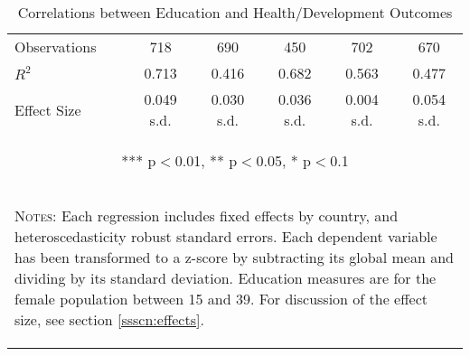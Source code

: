 \begin{landscape}
\begin{table}[htpb!]
\begin{center}
\begin{tabular}{lccccc}
Observations	&	718	&	690	&	450	&	702	&	670	\\
$R^2$	&	0.713	&	0.416	&	0.682	&	0.563	&	0.477	\\ 
Effect Size & 0.049 s.d. & 0.030 s.d. & 0.036 s.d. & 0.004 s.d. & 0.054 s.d. \\
\midrule
\multicolumn{6}{c}{\begin{footnotesize} *** p$<$0.01, ** p$<$0.05, * p$<$0.1\end{footnotesize}} \\											
\multicolumn{6}{p{17.7cm}}{\begin{footnotesize}\textsc{Notes:} Each regression includes fixed effects by country, and heteroscedasticity robust standard errors.  Each dependent variable has been transformed to a z-score by subtracting its global mean and dividing by its standard deviation.  Education measures are for the female population between 15 and 39. For discussion of the effect size, see section \ref{ssscn:effects}. \end{footnotesize}} \\											
\bottomrule											
\end{tabular}											
\caption{Correlations between Education and Health/Development Outcomes}											
\vspace{-6mm}											
\label{tab:Zscore}											
\end{center}											
\end{table}											
\end{landscape}

